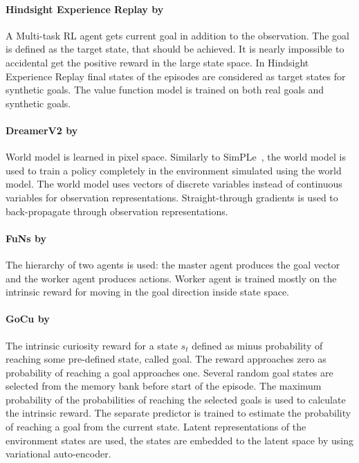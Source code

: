 \documentclass{article}
\begin{document}
\paragraph{Hindsight Experience Replay by~\citet{andrychowicz_hindsight_2017}} %
\label{par:hindsight}

A Multi-task RL agent gets current goal in addition to the observation. The goal is defined as the target state, that should be achieved. It is nearly impossible to accidental get the positive reward in the large state space. In Hindsight Experience Replay final states of the episodes are considered as target states for synthetic goals. The value function model is trained on both real goals and synthetic goals.


\paragraph{DreamerV2 by~\citet{Kaiser2020ModelBasedRL}} %
\label{par:dreamer_v2}

World model is learned in pixel space. Similarly to SimPLe~\citep{Kaiser2020ModelBasedRL}, the world model is used to train a policy completely in the environment simulated using the world model. The world model uses vectors of discrete variables instead of continuous variables for observation representations. Straight-through gradients is used to back-propagate through observation representations.


\paragraph{FuNs by~\citet{Vezhnevets2017FeUdalNF}} %
\label{par:funs}

The hierarchy of two agents is used: the master agent produces the goal vector and the worker agent produces actions. Worker agent is trained mostly on the intrinsic reward for moving in the goal direction inside state space.



\paragraph{GoCu by~\citet{Bougie2019SkillbasedCF}} %
\label{par:gocu}

The intrinsic curiosity reward for a state $s_t$ defined as minus probability of reaching some pre-defined state, called goal. The reward approaches zero as probability of reaching a goal approaches one. Several random goal states are selected from the memory bank before start of the episode. The maximum probability of the probabilities of reaching the selected goals is used to calculate the intrinsic reward. The separate predictor is trained to estimate the probability of reaching a goal from the current state. Latent representations of the environment states are used, the states are embedded to the latent space by using variational auto-encoder.
\end{document}
